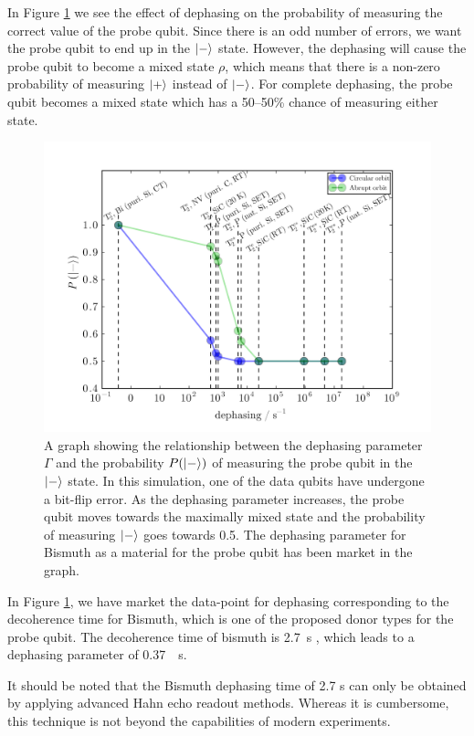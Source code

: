 In Figure \ref{fig:phaseplot} we see the effect of dephasing on the probability of measuring the correct value of the probe qubit. Since there is an odd number of errors, we want the probe qubit to end up in the $\ket{-}$ state. However, the dephasing will cause the probe qubit to become a mixed state $\rho$, which means that there is a non-zero probability of measuring $\ket{+} $ instead of $\ket{-}$. For complete dephasing, the probe qubit becomes a mixed state which has a 50--50\% chance of measuring either state. 

\begin{figure}[!ht]
	\centering
	\includegraphics[width=\textwidth]{../Figures/phase_graph.png}
		\caption{A graph showing the relationship between the dephasing parameter $\Gamma$ and the probability $P(\ket{-})$ of measuring the probe qubit in the $\ket{-}$ state. In this simulation, one of the data qubits have undergone a bit-flip error. As the dephasing parameter increases, the probe qubit moves towards the maximally mixed state and the probability of measuring $\ket{-}$ goes towards 0.5. The dephasing parameter for Bismuth as a material for the probe qubit has been market in the graph.}
		\label{fig:phaseplot}
\end{figure}


In Figure \ref{fig:phaseplot}, we have market the data-point for dephasing corresponding to the decoherence time for Bismuth, which is one of the proposed donor types for the probe qubit. The decoherence time of bismuth is \SI{2.7}{\second} \cite{Wolfowicz2013}, which leads to a dephasing parameter of \SI{0.37}{\per\second}. 


It should be noted that the Bismuth dephasing time of 2.7 s can only be obtained by applying advanced Hahn echo readout methods. Whereas it is cumbersome, this technique is not beyond the capabilities of modern experiments. 

